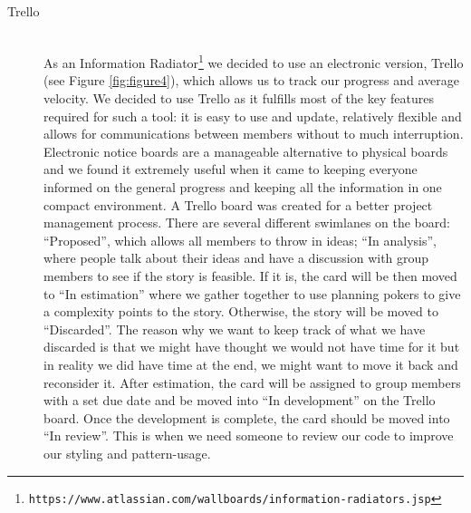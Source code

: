 \documentclass[11pt, a4paper]{article}
\begin{document}
\begin{description}
  \item[Trello] \hfill \\
  As an Information Radiator\footnote{\tt{https://www.atlassian.com/wallboards/information-radiators.jsp}} we decided to use an electronic version, Trello (see Figure \ref{fig:figure4}), which allows us to track our progress and average velocity. We decided to use Trello as it fulfills most of the key features required for such a tool: it is easy to use and update, relatively flexible and allows for communications between members without to much interruption. Electronic notice boards are a manageable alternative to physical boards and we found it extremely useful when it came to keeping everyone informed on the general progress and keeping all the information in one compact environment. 
  A Trello board was created for a better project management process. There are several different swimlanes on the board: ``Proposed'', which allows all members to throw in ideas; ``In analysis'', where people talk about their ideas and have a discussion with group members to see if the story is feasible. If it is, the card will be then moved to ``In estimation'' where we gather together to use planning pokers to give a complexity points to the story. Otherwise, the story will be moved to ``Discarded''. The reason why we want to keep track of what we have discarded is that we might have thought we would not have time for it but in reality we did have time at the end, we might want to move it back and reconsider it. After estimation, the card will be assigned to group members with a set due date and be moved into ``In development'' on the Trello board. Once the development is complete, the card should be moved into ``In review''. This is when we need someone to review our code to improve our styling and pattern-usage.  


\end{description}
\end{document}
